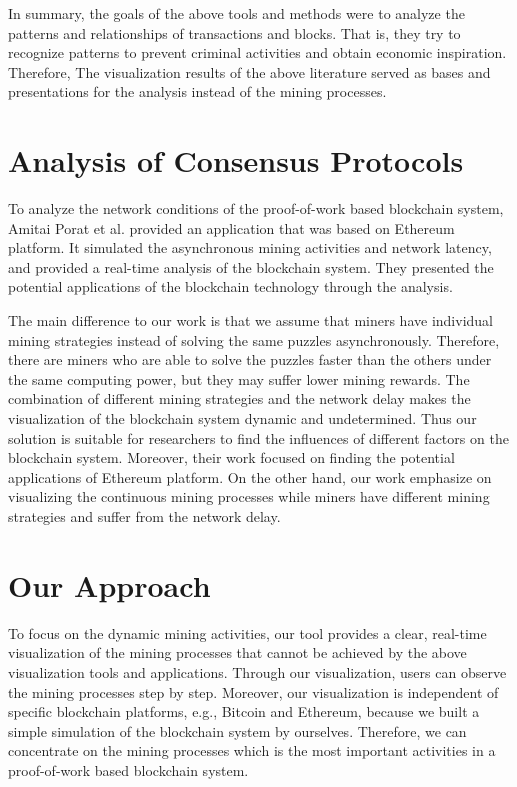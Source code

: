In summary, the goals of the above tools and methods were to analyze the patterns and relationships of transactions and blocks. That is, they try to recognize patterns to prevent criminal activities and obtain economic inspiration. Therefore, The visualization results of the above literature served as bases and presentations for the analysis instead of the mining processes.

\section{Analysis of Consensus Protocols}

To analyze the network conditions of the proof-of-work based blockchain system, Amitai Porat et al. \cite{Porat} provided an application that was based on Ethereum platform. It simulated the asynchronous mining activities and network latency, and provided a real-time analysis of the blockchain system. They presented the potential applications of the blockchain technology through the analysis.

The main difference to our work is that we assume that miners have individual mining strategies instead of solving the same puzzles asynchronously. Therefore, there are miners who are able to solve the puzzles faster than the others under the same computing power, but they may suffer lower mining rewards. The combination of different mining strategies and the network delay makes the visualization of the blockchain system dynamic and undetermined. Thus our solution is suitable for researchers to find the influences of different factors on the blockchain system. Moreover, their work focused on finding the potential applications of Ethereum platform. On the other hand, our work emphasize on visualizing the continuous mining processes while miners have different mining strategies and suffer from the network delay. 

\section{Our Approach}

To focus on the dynamic mining activities, our tool provides a clear, real-time visualization of the mining processes that cannot be achieved by the above visualization tools and applications. Through our visualization, users can observe the mining processes step by step. Moreover, our visualization is independent of specific blockchain platforms, e.g., Bitcoin and Ethereum, because we built a simple simulation of the blockchain system by ourselves. Therefore, we can concentrate on the mining processes which is the most important activities in a proof-of-work based blockchain system.

